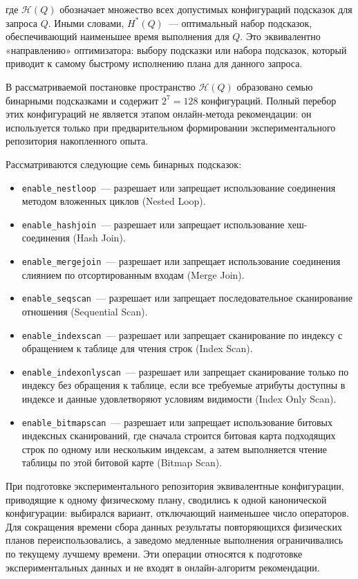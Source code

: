 где $\mathcal{H}(Q)$ обозначает множество всех допустимых конфигураций подсказок для запроса $Q$. Иными словами, $H^*(Q)$~--- оптимальный набор подсказок, обеспечивающий наименьшее время выполнения для $Q$. Это эквивалентно «направлению» оптимизатора: выбору подсказки или набора подсказок, который приводит к самому быстрому исполнению плана для данного запроса.

В рассматриваемой постановке пространство $\mathcal{H}(Q)$ образовано семью бинарными подсказками и содержит $2^7=128$ конфигураций. Полный перебор этих конфигураций не является этапом онлайн-метода рекомендации: он используется только при предварительном формировании экспериментального репозитория накопленного опыта.

\medskip
\noindent
Рассматриваются следующие семь бинарных подсказок:

\begin{itemize}
  \item \texttt{enable\_nestloop}~--- разрешает или запрещает использование соединения методом вложенных циклов (Nested Loop).
  \item \texttt{enable\_hashjoin}~--- разрешает или запрещает использование хеш-соединения (Hash Join).
  \item \texttt{enable\_mergejoin}~--- разрешает или запрещает использование соединения слиянием по отсортированным входам (Merge Join).
  \item \texttt{enable\_seqscan}~--- разрешает или запрещает последовательное сканирование отношения (Sequential Scan).
  \item \texttt{enable\_indexscan}~--- разрешает или запрещает сканирование по индексу с обращением к таблице для чтения строк (Index Scan).
  \item \texttt{enable\_indexonlyscan}~--- разрешает или запрещает сканирование только по индексу без обращения к таблице, если все требуемые атрибуты доступны в индексе и данные удовлетворяют условиям видимости (Index Only Scan).
  \item \texttt{enable\_bitmapscan}~--- разрешает или запрещает использование битовых индексных сканирований, где сначала строится битовая карта подходящих строк по одному или нескольким индексам, а затем выполняется чтение таблицы по этой битовой карте (Bitmap Scan).
\end{itemize}

При подготовке экспериментального репозитория эквивалентные конфигурации, приводящие к одному физическому плану, сводились к одной канонической конфигурации: выбирался вариант, отключающий наименьшее число операторов. Для сокращения времени сбора данных результаты повторяющихся физических планов переиспользовались, а заведомо медленные выполнения ограничивались по текущему лучшему времени. Эти операции относятся к подготовке экспериментальных данных и не входят в онлайн-алгоритм рекомендации.

